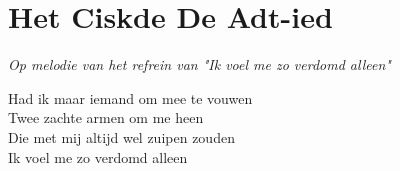 \section{Het Ciskde De Adt-ied}
\textit{Op melodie van het refrein van "Ik voel me zo verdomd alleen"}

Had ik maar iemand om mee te vouwen\\
Twee zachte armen om me heen\\
Die met mij altijd wel zuipen zouden\\
Ik voel me zo verdomd alleen